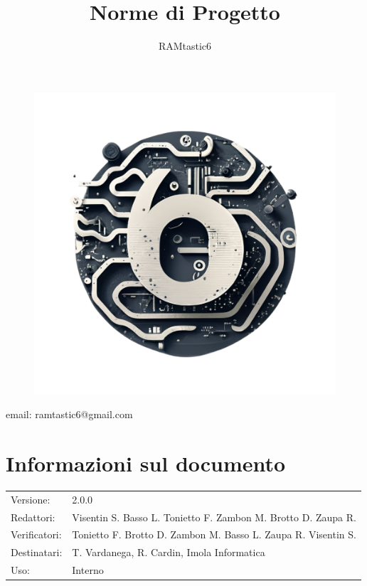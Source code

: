 \documentclass[12pt, oneside]{article}
\author{RAMtastic6}
\begin{document}
\thispagestyle{empty}
\title{Norme di Progetto}
\maketitle
\begin{figure}[h]
  \centering
  \includegraphics[scale=0.3]{logo.png}
\end{figure}
\begin{center}
    email: ramtastic6@gmail.com
\end{center}

\section*{Informazioni sul documento}
\begin{tabular}{ll}
Versione: & 2.0.0 \\
Redattori: &  Visentin S. Basso L. Tonietto F. Zambon M. Brotto D. Zaupa R.\\
Verificatori: & Tonietto F. Brotto D. Zambon M. Basso L. Zaupa R. Visentin S.\\
Destinatari: & T. Vardanega, R. Cardin, Imola Informatica \\
Uso: & Interno
\end{tabular}
\newpage
\end{document}
